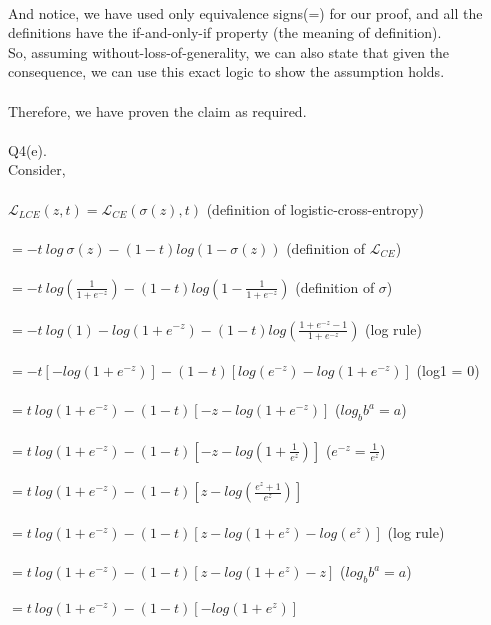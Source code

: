 \documentclass{article}
\begin{document}
{\\
\indent \indent And notice, we have used only equivalence signs(=) for our proof, and all the definitions have the if-and-only-if property (the meaning of definition).\\
\indent \indent So, assuming without-loss-of-generality, we can also state that given the consequence, we can use this exact logic to show the assumption holds.\\
\\
\indent \indent Therefore, we have proven the claim as required.\\
\\
Q4(e).\\
\indent \indent Consider,\\
\\
\indent \indent $\mathcal{L}_{LCE}(z,t) = \mathcal{L}_{CE}(\sigma(z),t)$ (definition of logistic-cross-entropy)\\
\\
\indent \indent $=-t\:log\:\sigma(z)-(1-t)log(1-\sigma(z))$ (definition of $\mathcal{L}_{CE}$)\\
\\
\indent \indent $=-t\:log(\frac{1}{1+e^{-z}}) - (1-t)log(1-\frac{1}{1+e^{-z}})$ (definition of $\sigma$)\\
\\
\indent \indent $=-t\:log(1) - log(1+e^{-z}) - (1-t)log(\frac{1+e^{-z}-1}{1+e^{-z}})$ (log rule)\\
\\
\indent \indent $=-t[-log(1+e^{-z})]-(1-t)[log(e^{-z})-log(1+e^{-z})]$ (log1 = 0)\\
\\
\indent \indent $=t\:log(1+e^{-z})-(1-t)[-z-log(1+e^{-z})]$ ($log_bb^a=a$)\\
\\
\indent \indent $=t\:log(1+e^{-z})-(1-t)[-z-log(1+\frac{1}{e^z})]$ ($e^{-z} = \frac{1}{e^z}$)\\
\\
\indent \indent $=t\:log(1+e^{-z})-(1-t)[z-log(\frac{e^z+1}{e^z})]$\\
\\
\indent \indent $=t\:log(1+e^{-z})-(1-t)[z-log(1+e^z)-log(e^z)]$ (log rule)\\
\\
\indent \indent $=t\:log(1+e^{-z})-(1-t)[z-log(1+e^z)-z]$ ($log_bb^a=a$)\\
\\
\indent \indent $=t\:log(1+e^{-z})-(1-t)[-log(1+e^z)]$\\
}
\end{document}
